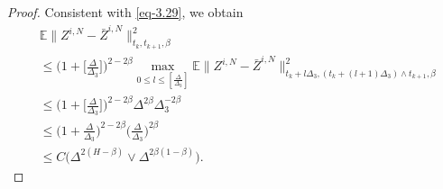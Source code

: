 \documentclass[10pt,a4paper]{amsart}
\def\E{\mathbb E}
\begin{document}
\begin{proof}
Consistent with \eqref{eq-3.29}, we  obtain
\begin{equation}
	\begin{aligned}
		&\E\|Z^{i,N}-\bar Z^{i,N}\|^2_{t_k,t_{k+1},\beta}\\
		&\leq \Big(1+\big[\frac{\Delta}{\Delta_3}\big]\Big)^{2-2\beta}\max_{0\leq l \leq [\frac{\Delta}{\Delta_3}]}\E\|Z^{i,N}-\bar Z^{i,N}\|^2_{t_k+l\Delta_3,(t_k+(l+1)\Delta_3)\wedge t_{k+1},\beta}\\
		&\leq \Big(1+\big[\frac{\Delta}{\Delta_3}\big]\Big)^{2-2\beta}\Delta^{2\beta}\Delta_3^{-2\beta}\\
		&\leq \Big(1+\frac{\Delta}{\Delta_3}\Big)^{2-2\beta}\big(\frac{\Delta}{\Delta_3}\big)^{2\beta}\\
		&\leq C\Big(\Delta^{2(H-\beta)}\vee \Delta^{2\beta(1-\beta)}\Big).
	\end{aligned}
\end{equation}		
\end{proof}
\end{document}
